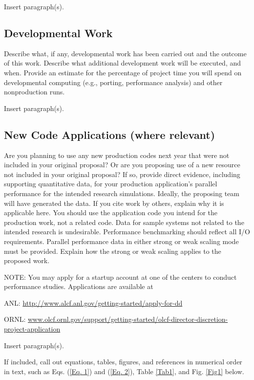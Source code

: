 \documentclass[11pt,letterpaper,english]{article}
\begin{document}
Insert paragraph(s).

\subsection{Developmental Work} 

Describe what, if any, developmental work has been carried out and the outcome of this work. Describe what additional development work will be executed, and when. Provide an estimate for the percentage of project time you will spend on developmental computing (e.g., porting, performance analysis) and other nonproduction runs.

Insert paragraph(s).

\subsection{New Code Applications (where relevant)} 

Are you planning to use any new production codes next year that were not included in your original proposal? Or are you proposing use of a new resource not included in your original proposal? If so, provide direct evidence, including supporting quantitative data, for your production application’s parallel performance for the intended research simulations. Ideally, the proposing team will have generated the data. If you cite work by others, explain why it is applicable here. You should use the application code you intend for the production work, not a related code. Data for sample systems not related to the intended research is undesirable. Performance benchmarking should reflect all I/O requirements. Parallel performance data in either strong or weak scaling mode must be provided. Explain how the strong or weak scaling applies to the proposed work. 

NOTE: You may apply for a startup account at one of the centers to conduct performance studies. Applications are available at

ANL: {\href{http://www.alcf.anl.gov/getting-started/apply-for-dd}{http://www.alcf.anl.gov/getting-started/apply-for-dd}}

ORNL: {\href{www.olcf.ornl.gov/support/getting-started/olcf-director-discretion-project-application}{www.olcf.ornl.gov/support/getting-started/olcf-director-discretion-project-application}}

Insert paragraph(s).

If included, call out equations, tables, figures, and references in numerical order in text, such as Eqs. (\ref{Eq. 1}) and (\ref{Eq. 2}), Table \ref{Tab1}, and Fig. \ref{Fig1} below.
\end{document}

